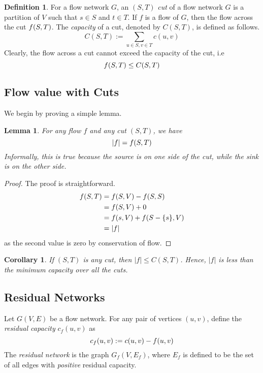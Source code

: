 \documentclass[12pt,a4paper]{amsart}
\numberwithin{equation}{section}
\newtheorem{Lemma}[Th]{Lemma}
\newtheorem{Cor}{Corollary}[Th]
\theoremstyle{definition}
\newtheorem{Def}{Definition}[section]
\begin{document}
\newcommand{\cut}[2]{(#1, #2)}
\newcommand{\capacity}[2]{C(#1, #2)}
\newcommand{\capacityExpand}[2]{\sum_{u\in #1, v\in #2}c(u, v)}

\begin{Def}
	For a flow network $G$, an $\cut{S}{T}$ \textit{cut} of a flow network $G$ is a partition of $V$ such that $s\in S$ and $t\in T$. If $f$ is a flow of $G$, then the flow across the cut $f(S, T)$. The \textit{capacity} of a cut, denoted by $\capacity{S}{T}$, is defined as follows.
	$$\capacity{S}{T} := \capacityExpand{S}{T}$$
	Clearly, the flow across a cut cannot exceed the capacity of the cut, i.e 
	$$\netflow{S}{T}\le \capacity{S}{T}$$
\end{Def}

\subsection{Flow value with Cuts} We begin by proving a simple lemma. 
\begin{Lemma}
	For any flow $f$ and any cut $\cut{S}{T}$, we have 
	$$|f| = f(S, T)$$
	Informally, this is true because the source is on one side of the cut, while the sink is on the other side. 
\end{Lemma}
\begin{proof}
	The proof is straightforward. 
	\begin{align*}
		f(S, T) &= f(S, V) - f(S, S)\\
		&= f(S, V) + 0\\
		&= f(s, V) + f(S - \{s\}, V)\\
		&= |f|
	\end{align*}
	as the second value is zero by conservation of flow. 
\end{proof}

\begin{Cor}
	\label{flowUpperBound}
	If $\cut{S}{T}$ is any cut, then $|f|\le \capacity{S}{T}$. Hence, $|f|$ is less than the minimum capacity over all the cuts. 
\end{Cor}

\newcommand{\residualCap}[2]{c_f(#1, #2)}
\newcommand{\residualCapPath}[1]{c_f(#1)}
\subsection{Residual Networks} Let $G(V, E)$ be a flow network. For any pair of vertices $(u, v)$, define the \textit{residual capacity} $\residualCap{u}{v}$ as
$$\residualCap{u}{v} := c(u, v) - \netflow{u}{v}$$
The \textit{residual network} is the graph $G_f(V, E_f)$, where $E_f$ is defined to be the set of all edges with \textit{positive} residual capacity. 
\end{document}
